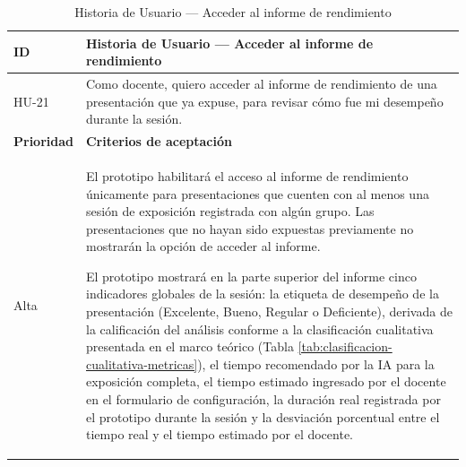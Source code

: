 \documentclass[11pt]{article}
\newcommand{\ttstyle}{%
  \small
  \setlength{\tabcolsep}{6pt}%
  \renewcommand{\arraystretch}{1.25}%
  \arrayrulecolor{azulprofundo}%
}
\newcommand{\hairrule}{%
  \arrayrulecolor{azulregla}\midrule[0.3pt]\arrayrulecolor{azulprofundo}%
}
\begin{document}
\begin{table}[H]
    \centering
    \renewcommand{\arraystretch}{1.2}
    \ttstyle
    \begin{tabular}{p{2.5cm}p{11cm}}
        \toprule
        \textbf{ID} & \textbf{Historia de Usuario --- Acceder al informe de rendimiento} \\
        \midrule
        HU-21 & Como docente, quiero acceder al informe de rendimiento de una presentación que ya expuse, para revisar cómo fue mi desempeño durante la sesión. \\
        \hairrule
        \textbf{Prioridad} & \textbf{Criterios de aceptación} \\
        \hairrule
        Alta & El prototipo habilitará el acceso al informe de rendimiento únicamente para presentaciones que cuenten con al menos una sesión de exposición registrada con algún grupo. Las presentaciones que no hayan sido expuestas previamente no mostrarán la opción de acceder al informe.

        El prototipo mostrará en la parte superior del informe cinco indicadores globales de la sesión: la etiqueta de desempeño de la presentación (Excelente, Bueno, Regular o Deficiente), derivada de la calificación del análisis conforme a la clasificación cualitativa presentada en el marco teórico (Tabla \ref{tab:clasificacion-cualitativa-metricas}), el tiempo recomendado por la IA para la exposición completa, el tiempo estimado ingresado por el docente en el formulario de configuración, la duración real registrada por el prototipo durante la sesión y la desviación porcentual entre el tiempo real y el tiempo estimado por el docente. \\
        \bottomrule
    \end{tabular}
    \caption{Historia de Usuario --- Acceder al informe de rendimiento}
    \label{tab:hu-acceder-informe-rendimiento}
\end{table}
\end{document}
